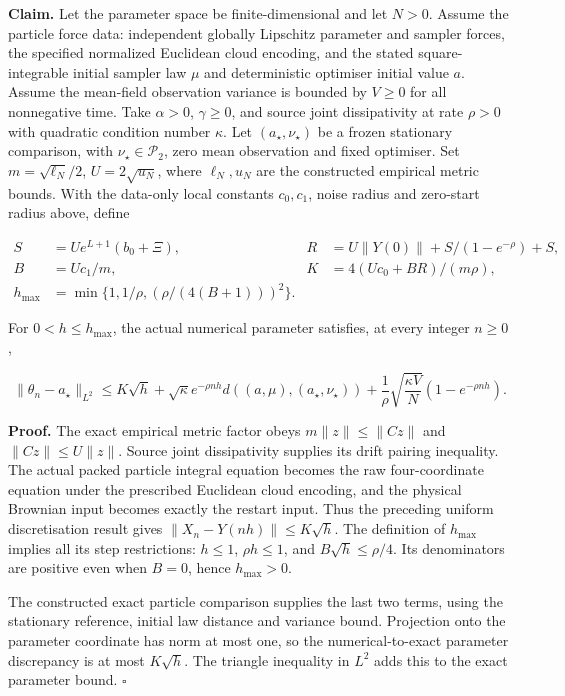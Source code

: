 \documentclass[11pt,a4paper]{report}
\begin{document}
\textbf{Claim.} Let the parameter space be finite-dimensional and let \(N>0\). Assume the particle force data: independent globally Lipschitz parameter and sampler forces, the specified normalized Euclidean cloud encoding, and the stated square-integrable initial sampler law \(\mu\) and deterministic optimiser initial value \(a\). Assume the mean-field observation variance is bounded by \(V\ge0\) for all nonnegative time. Take \(\alpha>0\), \(\gamma\ge0\), and source joint dissipativity at rate \(\rho>0\) with quadratic condition number \(\kappa\). Let \((a_\star,\nu_\star)\) be a frozen stationary comparison, with \(\nu_\star\in\mathcal P_2\), zero mean observation and fixed optimiser. Set \(m=\sqrt{\ell_N}/2\), \(U=2\sqrt{u_N}\), where \(\ell_N,u_N\) are the constructed empirical metric bounds. With the data-only local constants \(c_0,c_1\), noise radius and zero-start radius above, define

\[\begin{aligned}S&=Ue^{L+1}(b_0+\Xi),& R&=U\|Y(0)\|+S/(1-e^{-\rho})+S,\\B&=Uc_1/m,& K&=4(Uc_0+BR)/(m\rho),\\h_{\max}&=\min\{1,1/\rho,(\rho/(4(B+1)))^2\}.\end{aligned}\]

For \(0<h\le h_{\max}\), the actual numerical parameter satisfies, at every integer \(n\ge0\),

\[\|\theta_n-a_\star\|_{L^2}\le K\sqrt h+\sqrt\kappa e^{-\rho nh}d((a,\mu),(a_\star,\nu_\star))+\frac1\rho\sqrt{\frac{\kappa V}{N}}(1-e^{-\rho nh}).\]

\textbf{Proof.} The exact empirical metric factor obeys \(m\|z\|\le\|Cz\|\) and \(\|Cz\|\le U\|z\|\). Source joint dissipativity supplies its drift pairing inequality. The actual packed particle integral equation becomes the raw four-coordinate equation under the prescribed Euclidean cloud encoding, and the physical Brownian input becomes exactly the restart input. Thus the preceding uniform discretisation result gives \(\|X_n-Y(nh)\|\le K\sqrt h\). The definition of \(h_{\max}\) implies all its step restrictions: \(h\le1\), \(\rho h\le1\), and \(B\sqrt h\le\rho/4\). Its denominators are positive even when \(B=0\), hence \(h_{\max}>0\).



The constructed exact particle comparison supplies the last two terms, using the stationary reference, initial law distance and variance bound. Projection onto the parameter coordinate has norm at most one, so the numerical-to-exact parameter discrepancy is at most \(K\sqrt h\). The triangle inequality in \(L^2\) adds this to the exact parameter bound. \(\square\)
\end{document}
